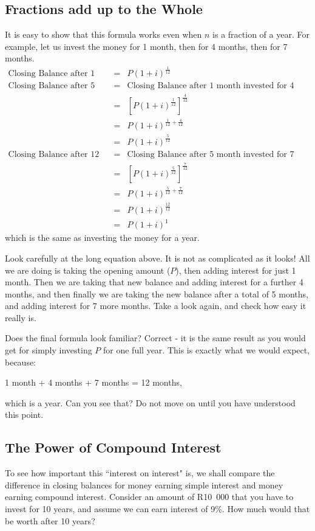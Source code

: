 \documentclass[10pt,a4paper,titlepage,twoside,openright]{report}
\begin{document}
\subsection{Fractions add up to the Whole}
It is easy to show that this formula works even when $n$ is a fraction of a year. For example, let us invest the money for 1 month, then for 4 months, then for 7 months. 
\begin{eqnarray*}
\mbox{Closing Balance after 1 month} &=& P (1+i)^{\frac{1}{12}}\\
\mbox{Closing Balance after 5 months} &=& \mbox{Closing Balance after 1 month invested for 4 months more}\\
&=&[P (1+i)^{\frac{1}{12}}]^{\frac{4}{12}}\\
&=&P (1+i)^{\frac{1}{12}+\frac{4}{12}}\\
&=&P (1+i)^{\frac{5}{12}}\\
\mbox{Closing Balance after 12 months} &=& \mbox{Closing Balance after 5 month invested for 7 months more}\\
&=&[P (1+i)^{\frac{5}{12}}]^{\frac{7}{12}}\\
&=&P (1+i)^{\frac{5}{12}+\frac{7}{12}}\\
&=&P (1+i)^{\frac{12}{12}}\\
&=&P (1+i)^{1}
\end{eqnarray*}
which is the same as investing the money for a year.

Look carefully at the long equation above. It is not as complicated as it looks! All we are doing is taking the opening amount ($P$), then adding interest for just 1 month. Then we are taking that new balance and adding interest for a further 4 months, and then finally we are taking the new balance after a total of 5 months, and adding interest for 7 more months. Take a look again, and check how easy it really is.

Does the final formula look familiar? Correct - it is the same result as you would get for simply investing $P$ for one full year. This is exactly what we would expect, because:
\begin{center}
1 month + 4 months + 7 months = 12 months,
\end{center}
which is a year. Can you see that? Do not move on until you have understood this point.


\subsection{The Power of Compound Interest}
To see how important this ``interest on interest" is, we shall compare the difference in closing balances for money earning simple interest and money earning compound interest. Consider an amount of R10~000 that you have to invest for 10 years, and assume we can earn interest of 9\%. How much would that be worth after 10 years?
\end{document}
